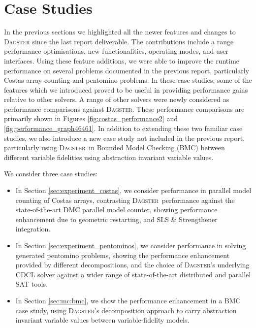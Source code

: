 \documentclass[10pt,a4paper,oneside,headinclude,footinclude,BCOR5mm]{scrartcl}
\newcommand{\dagster}{\textsc{Dagster}\xspace}
\begin{document}
\section{Case Studies}\label{sec:casestudies}


In the previous sections we highlighted all the newer features and changes to \dagster since the last report deliverable.
The contributions include a range performance optimisations, new functionalities, operating modes, and user interfaces.
Using these feature additions, we were able to improve the runtime performance on several problems documented in the previous report, particularly Costas array counting and pentomino problems.
In these case studies, some of the features which we introduced proved to be useful in providing performance gains relative to other solvers.
A range of other solvers were newly considered as performance comparisons against \dagster.
These performance comparisons are primarily shown in Figures \ref{fig:costas_performance2} and \ref{fig:performance_graph46461}.
In addition to extending these two familiar case studies, we also introduce a new case study not included in the previous report, particularly using \dagster\ in Bounded Model Checking (BMC) between different variable fidelities using abstraction invariant variable values.

We consider three case studies:
\begin{itemize}
\item	In Section \ref{sec:experiment_costas}, we consider performance in parallel model counting of Costas arrays, contrasting \dagster\ performance against the state-of-the-art \textsc{DMC} parallel model counter, showing performance enhancement due to geometric restarting, and SLS \& Strengthener integration.
  
\item	In Section \ref{sec:experiment_pentominos}, we consider performance in solving generated pentomino problems, showing the performance enhancement provided by different decompositions, and the choice of \dagster's underlying CDCL solver against a wider range of state-of-the-art distributed and parallel SAT tools.
  
\item In Section \ref{sec:mc:bmc}, we show the performance enhancement in a  BMC case study, using \dagster's decomposition approach to carry abstraction invariant variable values between variable-fidelity models.
\end{itemize}
\end{document}
